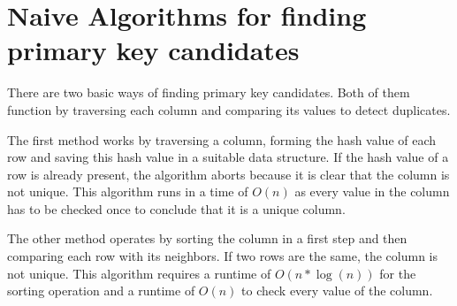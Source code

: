 \section{Naive Algorithms for finding primary key candidates}\label{sec:naive_algorithm}
There are two basic ways of finding primary key candidates. Both of them function by traversing each column and comparing its values to detect duplicates.

The first method works by traversing a column, forming the hash value of each row and saving this hash value in a suitable data structure. If the hash value of a row is already present, the algorithm aborts because it is clear that the column is not unique. This algorithm runs in a time of \(O(n)\) as every value in the column has to be checked once to conclude that it is a unique column.

The other method operates by sorting the column in a first step and then comparing each row with its neighbors. If two rows are the same, the column is not unique. This algorithm requires a runtime of \(O(n*\log(n))\) for the sorting operation and a runtime of \(O(n)\) to check every value of the column.
